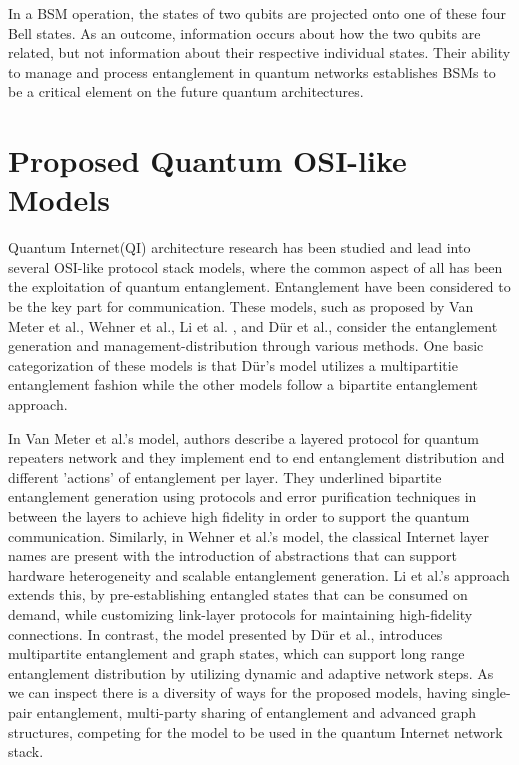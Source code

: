 		In a BSM operation, the states of two qubits are projected onto one of these four Bell states. 
		As an outcome, information occurs about how the two qubits are related, but not information
		about their respective individual states. Their ability to manage and process entanglement
		in quantum networks establishes BSMs to be a critical element on the future quantum architectures. 


		\section{Proposed Quantum OSI-like Models}
		
		Quantum Internet(QI) architecture research has been studied and lead into several OSI-like protocol 
		stack models, where the common aspect of all has been the exploitation of
		quantum entanglement. Entanglement have been considered to be the key part for communication. 
		These models, such as proposed by Van Meter et al.\cite{quantum-arch}, 
		Wehner et al.\cite{wehner-arch}, Li et al. \cite{li-arch}, and Dür et al.\cite{dur-multipartite}, 
		consider the entanglement generation and management-distribution through various methods.
		One basic categorization of these models is that Dür's model utilizes a multipartitie entanglement fashion
		while the other models follow a bipartite entanglement approach.
		
		In Van Meter et al.'s model, authors describe a layered protocol for quantum repeaters network and
		they implement end to end entanglement distribution and different 'actions' of entanglement per layer.
		They underlined bipartite entanglement generation using protocols and error purification techniques in between the
		layers to achieve  high fidelity in order to support the quantum communication.
		Similarly, in Wehner et al.'s model, the classical Internet layer names are present with the introduction
		of abstractions that can support hardware heterogeneity and scalable entanglement generation. 
		Li et al.'s approach extends this, by pre-establishing entangled states that can be consumed on demand, 
		while customizing link-layer protocols for maintaining high-fidelity connections. 
		In contrast, the model presented by Dür et al., introduces multipartite entanglement and graph states, 
		which can support long range entanglement distribution by utilizing dynamic and adaptive network steps. 
		As we can inspect there is a diversity of ways for the proposed models, having single-pair entanglement, 
		multi-party sharing of entanglement and advanced graph structures, competing for the model to be used
		in the quantum Internet network stack.

